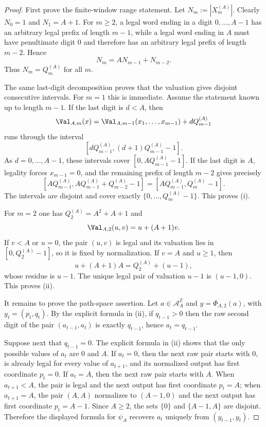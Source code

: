 \begin{proof}
First prove the finite-window range statement.  Let $N_m:=|X_m^{(A)}|$.
Clearly $N_0=1$ and $N_1=A+1$.  For $m\ge2$, a legal word ending in a digit
$0,\ldots,A-1$ has an arbitrary legal prefix of length $m-1$, while a legal
word ending in $A$ must have penultimate digit $0$ and therefore has an
arbitrary legal prefix of length $m-2$.  Hence
\[
N_m=A N_{m-1}+N_{m-2}.
\]
Thus $N_m=Q_m^{(A)}$ for all $m$.

The same last-digit decomposition proves that the valuation gives disjoint
consecutive intervals. For $m=1$ this is immediate. Assume the statement
known up to length $m-1$. If the last digit is $d<A$, then
\[
\Val_{A,m}(x)=\Val_{A,m-1}(x_1,\ldots,x_{m-1})+dQ_{m-1}^{(A)}
\]
runs through the interval
\[
[dQ_{m-1}^{(A)},(d+1)Q_{m-1}^{(A)}-1].
\]
As $d=0,\ldots,A-1$, these intervals cover
$[0,AQ_{m-1}^{(A)}-1]$. If the last digit is $A$, legality forces
$x_{m-1}=0$, and the remaining prefix of length $m-2$ gives precisely
\[
[AQ_{m-1}^{(A)},AQ_{m-1}^{(A)}+Q_{m-2}^{(A)}-1]
=[AQ_{m-1}^{(A)},Q_m^{(A)}-1].
\]
The intervals are disjoint and cover exactly
$\{0,\ldots,Q_m^{(A)}-1\}$.  This proves (i).

For $m=2$ one has $Q_2^{(A)}=A^2+A+1$ and
\[
\Val_{A,2}(u,v)=u+(A+1)v.
\]
If $v<A$ or $u=0$, the pair $(u,v)$ is legal and its valuation lies in
$[0,Q_2^{(A)}-1]$, so it is fixed by normalization.  If $v=A$ and $u\ge1$,
then
\[
u+(A+1)A=Q_2^{(A)}+(u-1),
\]
whose residue is $u-1$.  The unique legal pair of valuation $u-1$ is
$(u-1,0)$.  This proves (ii).

It remains to prove the path-space assertion. Let
$a\in\mathcal A_A^{\mathbb Z}$ and $y=\Phi_{A,2}(a)$, with
$y_t=(p_t,q_t)$.  By the explicit formula in (ii), if $q_{t-1}>0$ then the
raw second digit of the pair $(a_{t-1},a_t)$ is exactly $q_{t-1}$, hence
$a_t=q_{t-1}$.

Suppose next that $q_{t-1}=0$.  The explicit formula in (ii) shows that the
only possible values of $a_t$ are $0$ and $A$.  If $a_t=0$, then the next raw
pair starts with $0$, is already legal for every value of $a_{t+1}$, and its
normalized output has first coordinate $p_t=0$.  If $a_t=A$, then the next raw
pair starts with $A$.  When $a_{t+1}<A$, the pair is legal and the next output
has first coordinate $p_t=A$; when $a_{t+1}=A$, the pair $(A,A)$ normalizes to
$(A-1,0)$ and the next output has first coordinate $p_t=A-1$.  Since
$A\ge2$, the sets $\{0\}$ and $\{A-1,A\}$ are disjoint.  Therefore the displayed
formula for $\psi_A$ recovers $a_t$ uniquely from $(y_{t-1},y_t)$.


\end{proof}
